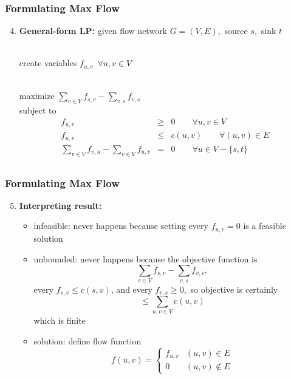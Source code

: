 \documentclass{beamer}
\newcommand{\stanza}{ \\~\ }
\begin{document}
\begin{frame} \frametitle{Formulating Max Flow}
  \begin{enumerate}
    \setcounter{enumi}{3}
\item \textbf{General-form LP:} given flow network $G=(V, E),$ source $s,$ sink $t$ \stanza

create variables $f_{u, v} \enspace \forall u, v \in V$ \stanza

maximize $\sum_{v \in V} f_{s, v} - \sum_{v, s} f_{v, s}$ \\
subject to
\begin{eqnarray*}
  f_{u, v} &\geq& 0 \qquad \forall u, v \in V \\
  f_{u, v} &\leq& c(u, v) \qquad \forall (u, v) \in E \\
  \sum_{v \in V} f_{v, u} - \sum_{v \in V} f_{u, v} &=& 0 \qquad \forall u \in V - \{s, t\} \\
\end{eqnarray*}
\end{enumerate}
\end{frame}

\begin{frame} \frametitle{Formulating Max Flow}
\begin{enumerate}
  \setcounter{enumi}{4}
  \item \textbf{Interpreting result:}
  \begin{itemize}
    \item infeasible: never happens because setting every $f_{u, v}=0$ is a feasible solution
    \item unbounded: never happens because the objective function is
    \[ \sum_{v \in V} f_{s, v} - \sum_{v, s} f_{v, s}, \]
     every $f_{s, v} \leq c(s, v)$, and every $f_{v, s} \geq 0,$
     so objective is certainly \[ \leq \sum_{u, v \in V} c(u, v) \] which is finite
    \item solution: define flow function
    \[ f(u, v) =
      \begin{cases}
        f_{u, v} & (u, v) \in E \\
        0 & (u, v) \notin E
      \end{cases}
    \]
  \end{itemize}
\end{enumerate}
\end{frame}
\end{document}
